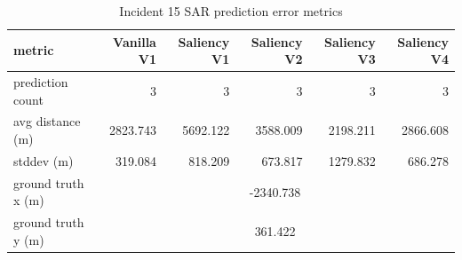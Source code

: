 \begin{table}[ht]
\centering
\caption{Incident 15 SAR prediction error metrics}
\label{tab:sar-incident-15}
\begin{tabular}{lrrrrr}
\hline
metric & Vanilla V1 & Saliency V1 & Saliency V2 & Saliency V3 & Saliency V4 \\
\hline
prediction count & 3 & 3 & 3 & 3 & 3 \\
avg distance (m) & 2823.743 & 5692.122 & 3588.009 & 2198.211 & 2866.608 \\
stddev (m) & 319.084 & 818.209 & 673.817 & 1279.832 & 686.278 \\
ground truth x (m) & \multicolumn{5}{c}{-2340.738} \\
ground truth y (m) & \multicolumn{5}{c}{361.422} \\
\hline
\end{tabular}
\end{table}
